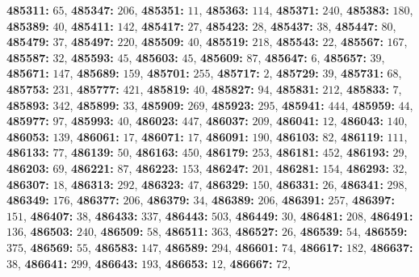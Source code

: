 \textsf{\bfseries 485311:} $65$, \textsf{\bfseries 485347:} $206$, \textsf{\bfseries 485351:} $11$, \textsf{\bfseries 485363:} $114$, \textsf{\bfseries 485371:} $240$, \textsf{\bfseries 485383:} $180$, \textsf{\bfseries 485389:} $40$, \textsf{\bfseries 485411:} $142$, \textsf{\bfseries 485417:} $27$, \textsf{\bfseries 485423:} $28$, \textsf{\bfseries 485437:} $38$, \textsf{\bfseries 485447:} $80$, \textsf{\bfseries 485479:} $37$, \textsf{\bfseries 485497:} $220$, \textsf{\bfseries 485509:} $40$, \textsf{\bfseries 485519:} $218$, \textsf{\bfseries 485543:} $22$, \textsf{\bfseries 485567:} $167$, \textsf{\bfseries 485587:} $32$, \textsf{\bfseries 485593:} $45$, \textsf{\bfseries 485603:} $45$, \textsf{\bfseries 485609:} $87$, \textsf{\bfseries 485647:} $6$, \textsf{\bfseries 485657:} $39$, \textsf{\bfseries 485671:} $147$, \textsf{\bfseries 485689:} $159$, \textsf{\bfseries 485701:} $255$, \textsf{\bfseries 485717:} $2$, \textsf{\bfseries 485729:} $39$, \textsf{\bfseries 485731:} $68$, \textsf{\bfseries 485753:} $231$, \textsf{\bfseries 485777:} $421$, \textsf{\bfseries 485819:} $40$, \textsf{\bfseries 485827:} $94$, \textsf{\bfseries 485831:} $212$, \textsf{\bfseries 485833:} $7$, \textsf{\bfseries 485893:} $342$, \textsf{\bfseries 485899:} $33$, \textsf{\bfseries 485909:} $269$, \textsf{\bfseries 485923:} $295$, \textsf{\bfseries 485941:} $444$, \textsf{\bfseries 485959:} $44$, \textsf{\bfseries 485977:} $97$, \textsf{\bfseries 485993:} $40$, \textsf{\bfseries 486023:} $447$, \textsf{\bfseries 486037:} $209$, \textsf{\bfseries 486041:} $12$, \textsf{\bfseries 486043:} $140$, \textsf{\bfseries 486053:} $139$, \textsf{\bfseries 486061:} $17$, \textsf{\bfseries 486071:} $17$, \textsf{\bfseries 486091:} $190$, \textsf{\bfseries 486103:} $82$, \textsf{\bfseries 486119:} $111$, \textsf{\bfseries 486133:} $77$, \textsf{\bfseries 486139:} $50$, \textsf{\bfseries 486163:} $450$, \textsf{\bfseries 486179:} $253$, \textsf{\bfseries 486181:} $452$, \textsf{\bfseries 486193:} $29$, \textsf{\bfseries 486203:} $69$, \textsf{\bfseries 486221:} $87$, \textsf{\bfseries 486223:} $153$, \textsf{\bfseries 486247:} $201$, \textsf{\bfseries 486281:} $154$, \textsf{\bfseries 486293:} $32$, \textsf{\bfseries 486307:} $18$, \textsf{\bfseries 486313:} $292$, \textsf{\bfseries 486323:} $47$, \textsf{\bfseries 486329:} $150$, \textsf{\bfseries 486331:} $26$, \textsf{\bfseries 486341:} $298$, \textsf{\bfseries 486349:} $176$, \textsf{\bfseries 486377:} $206$, \textsf{\bfseries 486379:} $34$, \textsf{\bfseries 486389:} $206$, \textsf{\bfseries 486391:} $257$, \textsf{\bfseries 486397:} $151$, \textsf{\bfseries 486407:} $38$, \textsf{\bfseries 486433:} $337$, \textsf{\bfseries 486443:} $503$, \textsf{\bfseries 486449:} $30$, \textsf{\bfseries 486481:} $208$, \textsf{\bfseries 486491:} $136$, \textsf{\bfseries 486503:} $240$, \textsf{\bfseries 486509:} $58$, \textsf{\bfseries 486511:} $363$, \textsf{\bfseries 486527:} $26$, \textsf{\bfseries 486539:} $54$, \textsf{\bfseries 486559:} $375$, \textsf{\bfseries 486569:} $55$, \textsf{\bfseries 486583:} $147$, \textsf{\bfseries 486589:} $294$, \textsf{\bfseries 486601:} $74$, \textsf{\bfseries 486617:} $182$, \textsf{\bfseries 486637:} $38$, \textsf{\bfseries 486641:} $299$, \textsf{\bfseries 486643:} $193$, \textsf{\bfseries 486653:} $12$, \textsf{\bfseries 486667:} $72$, 

